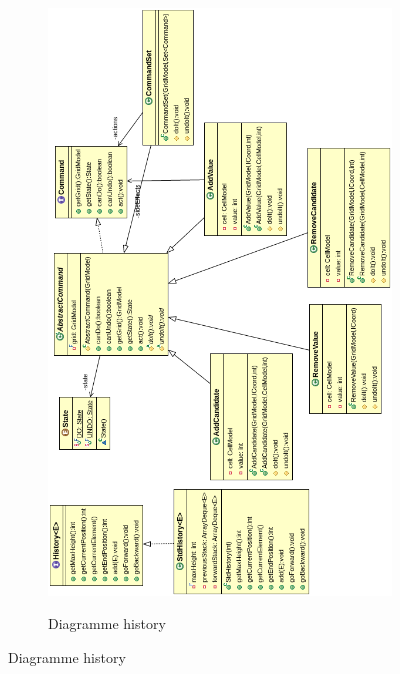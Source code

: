 \begin{figure}[ht]
\begin{figure}[ht]
  \caption{\label{annexe17} Diagramme history}
  \includegraphics [width=140mm]{images/history.png} \\[0.5cm]
\end{figure}


\end{figure}
